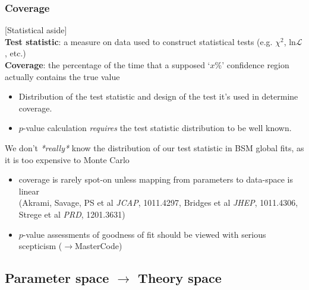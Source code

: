 \documentclass[xcolor=dvipsnames]{beamer}
\newcommand{\cblue}[1]{{\color[rgb]{0.1, 0.0, 0.6} #1}}
\begin{document}
\begin{frame}
\frametitle{Coverage}

{\scriptsize
[Statistical aside]\\\vspace{1mm}
\textbf{Test statistic}: a measure on data used to construct statistical tests (e.g. $\chi^2$, ln$\mathcal{L}$, etc.)\\
\textbf{Coverage}: the percentage of the time that a supposed `$x\%$' confidence region\\ actually contains the true value\\
\begin{itemize}
\item Distribution of the test statistic and design of the test it's used in determine coverage.
\item $p$-value calculation \textit{requires} the test statistic distribution to be well known.
\end{itemize}
}\vspace{3mm}

\cblue{We don't \textit{*really*} know the distribution of our test statistic in BSM global fits, as it is too expensive to Monte Carlo}
      \begin{itemize}\footnotesize
                 \item coverage is rarely spot-on unless mapping from parameters to data-space is linear \\
                 {\tiny(Akrami, Savage, PS et al {\it JCAP}, 1011.4297, Bridges et al {\it JHEP}, 1011.4306, Strege et al {\it PRD}, 1201.3631)}
                 \item $p$-value assessments of goodness of fit should be viewed with serious scepticism ($\rightarrow$MasterCode)
                 \end{itemize}

\end{frame}


\subsection{Parameter space $\rightarrow$ Theory space}
\end{document}
